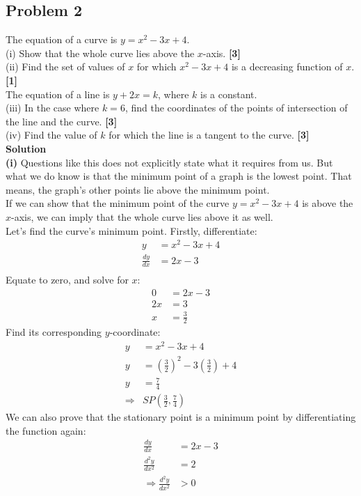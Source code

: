 \documentclass[hidelinks, a4paper, 12pt]{article}
\newcommand{\bd}{\textbf}
\newcommand{\n}{\\[\baselineskip]}
\newcommand{\thus}{\Rightarrow}
\newcommand{\dydx}{\frac{dy}{dx}}
\newcommand{\dydxx}{\frac{d^2y}{dx^2}}
\begin{document}
        \subsection{Problem 2}
            The equation of a curve is $y=x^2-3x+4$.\n
            (i) Show that the whole curve lies above the $x$-axis. \bd{[3]}\n
            (ii) Find the set of values of $x$ for which $x^2-3x+4$ is a decreasing function of $x$. \bd{[1]}\n
            The equation of a line is $y+2x=k$, where $k$ is a constant.\n
            (iii) In the case where $k=6$, find the coordinates of the points of intersection of the line and the curve. \bd{[3]}\n
            (iv) Find the value of $k$ for which the line is a tangent to the curve. \bd{[3]}\n
            \bd{Solution}\n
            \bd{(i)} Questions like this does not explicitly state what it requires from us. But what we do know is that the minimum point of a graph
            is the lowest point. That means, the graph's other points lie above the minimum point.\n
            If we can show that the minimum point of the curve $y=x^2-3x+4$ is above the $x$-axis, we can imply that the whole curve lies above it as well.\n
            Let's find the curve's minimum point. Firstly, differentiate:
            \[\begin{split}
                y &= x^2-3x+4\\
                \dydx &= 2x-3\\
            \end{split}\] 
            Equate to zero, and solve for $x$:
            \[\begin{split}
                0 &= 2x-3\\
                2x &= 3\\
                x &= \frac{3}{2}
            \end{split}\]
            Find its corresponding $y$-coordinate:
            \[\begin{split}
                y &= x^2-3x+4\\
                y &= \left(\frac{3}{2}\right)^2-3\left(\frac{3}{2}\right)+4\\
                y &= \frac{7}{4}\\
                \thus &SP \left(\frac{3}{2}, \frac{7}{4}\right)
            \end{split}\]
            We can also prove that the stationary point is a minimum point by differentiating the function again:
            \[\begin{split}
                \dydx &= 2x-3\\
                \dydxx &= 2\\
                \thus \dydxx &> 0
            \end{split}\]
\end{document}
